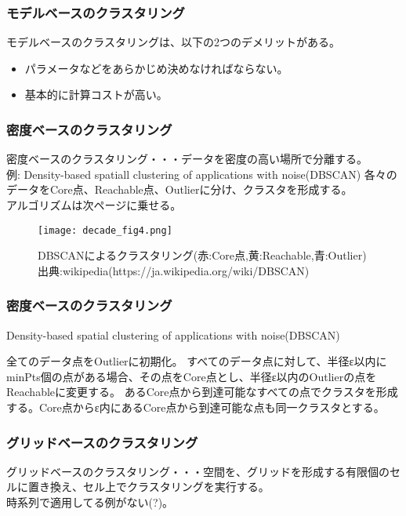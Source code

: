 \documentclass[dvipdfmx,11pt,notheorems]{beamer}
\theoremstyle{definition}
\begin{document}
\begin{frame}\frametitle{モデルベースのクラスタリング}
モデルベースのクラスタリングは、以下の2つのデメリットがある。
\begin{itemize}
\item パラメータなどをあらかじめ決めなければならない。
\item 基本的に計算コストが高い。
\end{itemize}
\end{frame}


\begin{frame}\frametitle{密度ベースのクラスタリング}
密度ベースのクラスタリング・・・データを密度の高い場所で分離する。\\
例: Density-based spatiall clustering of applications with noise(DBSCAN)
各々のデータをCore点、Reachable点、Outlierに分け、クラスタを形成する。\\
アルゴリズムは次ページに乗せる。
\begin{figure}[h]
\begin{center}
\texttt{[image: decade\_fig4.png]}
\end{center}
\caption{DBSCANによるクラスタリング(赤:Core点,黄:Reachable,青:Outlier) 出典:wikipedia(https://ja.wikipedia.org/wiki/DBSCAN)}
\end{figure}

\end{frame}


\begin{frame}\frametitle{密度ベースのクラスタリング}
\begin{algorithm}[H]
\caption{Density-based spatial clustering of applications with noise(DBSCAN)}
\begin{algorithmic}[1]
\STATE 全てのデータ点をOutlierに初期化。
\STATE すべてのデータ点に対して、半径ε以内にminPts個の点がある場合、その点をCore点とし、半径ε以内のOutlierの点をReachableに変更する。
\STATE あるCore点から到達可能なすべての点でクラスタを形成する。Core点からε内にあるCore点から到達可能な点も同一クラスタとする。
\end{algorithmic}
\end{algorithm}
\end{frame}

\begin{frame}\frametitle{グリッドベースのクラスタリング}
グリッドベースのクラスタリング・・・空間を、グリッドを形成する有限個のセルに置き換え、セル上でクラスタリングを実行する。\\
時系列で適用してる例がない(?)。

\end{frame}
\end{document}
